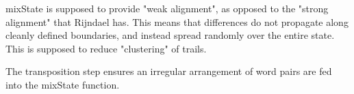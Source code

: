\documentclass[preprint]{iacrtrans}
\begin{document}
mixState is supposed to provide "weak alignment", as opposed to the "strong alignment" that Rijndael has. This means that differences do not propagate along cleanly defined boundaries, and instead spread randomly over the entire state. This is supposed to reduce "clustering" of trails.

The transposition step ensures an irregular arrangement of word pairs are fed into the mixState function. 
\end{document}
